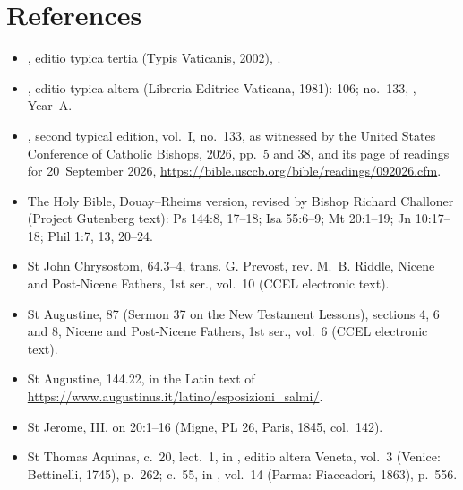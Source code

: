 \section*{References}

{\small
\begin{itemize}\setlength{\itemsep}{0.15em}\setlength{\parskip}{0pt}
\item {}, editio typica tertia (Typis Vaticanis, 2002), .
\item {}, editio typica altera (Libreria Editrice Vaticana, 1981):  106; no.~133, , Year~A.
\item {}, second typical edition, vol.~I, no.~133, as witnessed by the United States Conference of Catholic Bishops,  2026, pp.~5 and 38, and its page of readings for 20~September 2026, \url{https://bible.usccb.org/bible/readings/092026.cfm}.
\item The Holy Bible, Douay--Rheims version, revised by Bishop Richard Challoner (Project Gutenberg text): Ps 144:8, 17--18; Isa 55:6--9; Mt 20:1--19; Jn 10:17--18; Phil 1:7, 13, 20--24.
\item St John Chrysostom,  64.3--4, trans. G. Prevost, rev. M.~B. Riddle, Nicene and Post-Nicene Fathers, 1st ser., vol.~10 (CCEL electronic text).
\item St Augustine,  87 (Sermon 37 on the New Testament Lessons), sections 4, 6 and 8, Nicene and Post-Nicene Fathers, 1st ser., vol.~6 (CCEL electronic text).
\item St Augustine,  144.22, in the Latin text of \url{https://www.augustinus.it/latino/esposizioni_salmi/}.
\item St Jerome,  III, on 20:1--16 (Migne, PL 26, Paris, 1845, col.~142).
\item St Thomas Aquinas,  c.~20, lect.~1, in , editio altera Veneta, vol.~3 (Venice: Bettinelli, 1745), p.~262;  c.~55, in , vol.~14 (Parma: Fiaccadori, 1863), p.~556.
\end{itemize}
\par}
